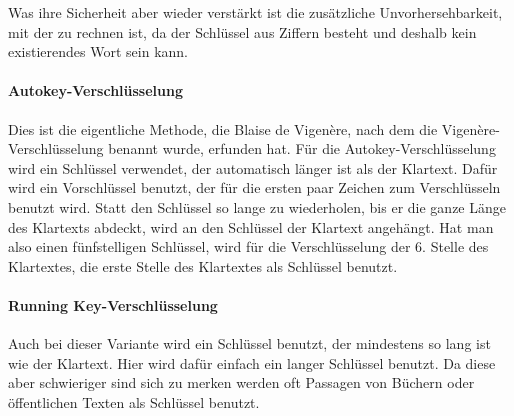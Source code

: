 Was ihre Sicherheit aber wieder verstärkt ist die zusätzliche Unvorhersehbarkeit, mit der zu rechnen ist, da der Schlüssel aus Ziffern besteht und deshalb kein existierendes Wort sein kann.


\paragraph{Autokey-Verschlüsselung}
\label{sec:v-autokey}
Dies ist die eigentliche Methode, die Blaise de Vigenère, nach dem die Vigenère-Verschlüsselung benannt wurde, erfunden hat. Für die Autokey-Verschlüsselung wird ein Schlüssel verwendet, der automatisch länger ist als der Klartext. Dafür wird ein Vorschlüssel benutzt, der für die ersten paar Zeichen zum Verschlüsseln benutzt wird. Statt den Schlüssel so lange zu wiederholen, bis er die ganze Länge des Klartexts abdeckt, wird an den Schlüssel der Klartext angehängt. Hat man also einen fünfstelligen Schlüssel, wird für die Verschlüsselung der 6. Stelle des Klartextes, die erste Stelle des Klartextes als Schlüssel benutzt.


\paragraph{Running Key-Verschlüsselung}
\label{sec:v-running-key}
Auch bei dieser Variante wird ein Schlüssel benutzt, der mindestens so lang ist wie der Klartext. Hier wird dafür einfach ein langer Schlüssel benutzt. Da diese aber schwieriger sind sich zu merken werden oft Passagen von Büchern oder öffentlichen Texten als Schlüssel benutzt. 




